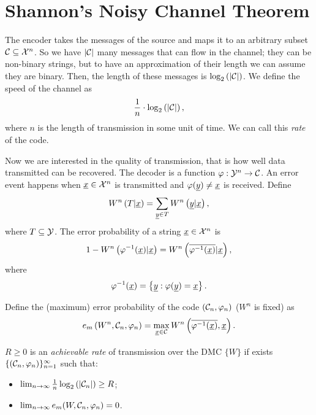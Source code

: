 \section{Shannon's Noisy Channel Theorem}

The encoder takes the messages of the source and maps it to an arbitrary subset $\mathcal{C} \subseteq \mathcal{X}^n$.
So we have $\left|{\mathcal{C}}\right|$ many messages that can flow in the channel; they can be non-binary strings, but to have an approximation of their length we can assume they are binary.
Then, the length of these messages is $\log_2 \left( {\left|{\mathcal{C}}\right|} \right)$.
We define the speed of the channel as
\begin{equation*}
	\frac{1}{n} \cdot \log_2 \left( {\left|{\mathcal{C}}\right|} \right),
\end{equation*}
where $n$ is the length of transmission in some unit of time.
We can call this \emph{rate} of the code.

Now we are interested in the quality of transmission, that is how well data transmitted can be recovered.
The decoder is a function $\varphi: \mathcal{Y}^n \to \mathcal{C}$.
An error event happens when $\underline{x} \in \mathcal{X}^n$ is transmitted and $\varphi(\underline{y}) \neq \underline{x}$ is received.
Define
\begin{equation*}
	W^n \left( T|\underline{x} \right)
	=
	\sum_{\underline{y} \in T} W^n \left( \underline{y}|\underline{x} \right),
\end{equation*}
where $T \subseteq \mathcal{Y}$.
The error probability of a string $\underline{x} \in \mathcal{X}^n$ is
\begin{equation*}
	1 - W^n \left( \varphi^{-1}(\underline{x}) | \underline{x} \right)
	=
	W^n \left( \overline{\varphi^{-1}(\underline{x})} | \underline{x} \right),
\end{equation*}
where
\begin{equation*}
	\varphi^{-1}(\underline{x}) = \left\{ \underline{y} : \varphi(\underline{y}) = \underline{x} \right\}.
\end{equation*}

Define the (maximum) error probability of the code $(\mathcal{C}_n, \varphi_n)$ ($W^n$ is fixed) as 
\begin{equation*}
	e_m \left( W^n, \mathcal{C}_n, \varphi_n \right)
	=
	\max_{\underline{x} \in \mathcal{C}} W^n \left( \overline{\varphi^{-1}(\underline{x})}, \underline{x} \right).
\end{equation*}

\begin{prop}
	$R \geq 0$ is an \emph{achievable rate} of transmission over the \ac{DMC} $\{ W \}$ if exists $\{(\mathcal{C}_n, \varphi_n)\}_{n=1}^\infty$ such that:
	\begin{itemize}
		\item $\lim_{n \to \infty} \frac{1}{n} \log_2 \left( {\left|{\mathcal{C}_n}\right|} \right) \ge R$;
		\item $\lim_{n \to \infty} e_m(W, \mathcal{C}_n, \varphi_n) = 0$.
	\end{itemize}
\end{prop}


